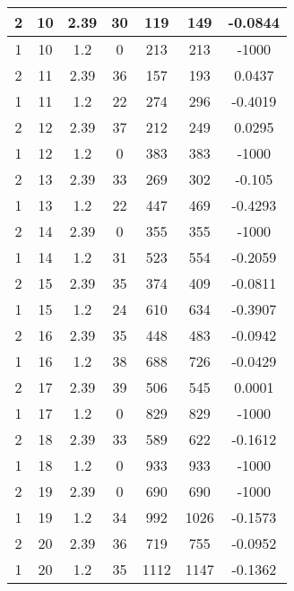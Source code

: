 \documentclass[letterpaper, 12pt]{article}
\begin{document}
\begin{longtable}{|c|c|c|c|c|c|c|}
\hline
2 & 10 & 2.39 & 30 & 119 & 149 & -0.0844 \\
\hline
1 & 10 & 1.2 & 0 & 213 & 213 & -1000 \\
\hline
2 & 11 & 2.39 & 36 & 157 & 193 & 0.0437 \\
\hline
1 & 11 & 1.2 & 22 & 274 & 296 & -0.4019 \\
\hline
2 & 12 & 2.39 & 37 & 212 & 249 & 0.0295 \\
\hline
1 & 12 & 1.2 & 0 & 383 & 383 & -1000 \\
\hline
2 & 13 & 2.39 & 33 & 269 & 302 & -0.105 \\
\hline
1 & 13 & 1.2 & 22 & 447 & 469 & -0.4293 \\
\hline
2 & 14 & 2.39 & 0 & 355 & 355 & -1000 \\
\hline
1 & 14 & 1.2 & 31 & 523 & 554 & -0.2059 \\
\hline
2 & 15 & 2.39 & 35 & 374 & 409 & -0.0811 \\
\hline
1 & 15 & 1.2 & 24 & 610 & 634 & -0.3907 \\
\hline
2 & 16 & 2.39 & 35 & 448 & 483 & -0.0942 \\
\hline
1 & 16 & 1.2 & 38 & 688 & 726 & -0.0429 \\
\hline
2 & 17 & 2.39 & 39 & 506 & 545 & 0.0001 \\
\hline
1 & 17 & 1.2 & 0 & 829 & 829 & -1000 \\
\hline
2 & 18 & 2.39 & 33 & 589 & 622 & -0.1612 \\
\hline
1 & 18 & 1.2 & 0 & 933 & 933 & -1000 \\
\hline
2 & 19 & 2.39 & 0 & 690 & 690 & -1000 \\
\hline
1 & 19 & 1.2 & 34 & 992 & 1026 & -0.1573 \\
\hline
2 & 20 & 2.39 & 36 & 719 & 755 & -0.0952 \\
\hline
1 & 20 & 1.2 & 35 & 1112 & 1147 & -0.1362 \\
\hline
\end{longtable}
\end{document}
